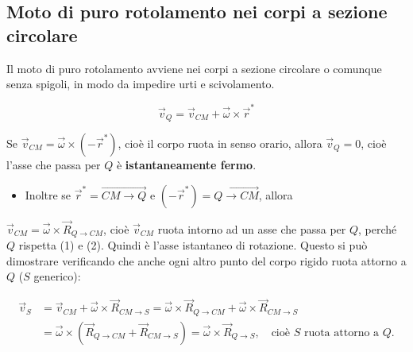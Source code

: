 
\subsection{Moto di puro rotolamento nei corpi a sezione circolare}

Il moto di puro rotolamento avviene nei corpi a sezione circolare o comunque senza spigoli, in modo da impedire urti e scivolamento.

\begin{equation}
\vec{v}_Q = \vec{v}_{CM} + \vec{\omega} \times \vec{r}^*
\end{equation}


Se $\vec{v}_{CM} = \vec{\omega} \times (-\vec{r}^*)$, cioè il corpo ruota in senso orario, allora $\vec{v}_Q = 0$, cioè l'asse che passa per $Q$ è \textbf{istantaneamente fermo}.

\begin{itemize}
    \item Inoltre se $\vec{r}^* = \overrightarrow{CM \to Q}$ e $(-\vec{r}^*) = \overrightarrow{Q \to CM}$, allora
\end{itemize}

$\vec{v}_{CM} = \vec{\omega} \times \vec{R}_{Q \to CM}$, cioè $\vec{v}_{CM}$ ruota intorno ad un asse che passa per $Q$, perché $Q$ rispetta (1) e (2). Quindi è l'asse istantaneo di rotazione. Questo si può dimostrare verificando che anche ogni altro punto del corpo rigido ruota attorno a $Q$ ($S$ generico):

\begin{align*}
\vec{v}_S &= \vec{v}_{CM} + \vec{\omega} \times \vec{R}_{CM \to S} = \vec{\omega} \times \vec{R}_{Q \to CM} + \vec{\omega} \times \vec{R}_{CM \to S} \\
&= \vec{\omega} \times (\vec{R}_{Q \to CM} + \vec{R}_{CM \to S}) = \vec{\omega} \times \vec{R}_{Q \to S}, \quad \text{cioè } S \text{ ruota attorno a } Q.
\end{align*}

